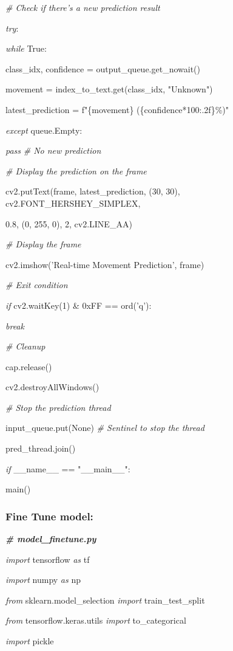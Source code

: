 \documentclass[
]{article}
\begin{document}
\emph{\# Check if there's a new prediction result}

\emph{try}:

\emph{while} True:

class\_idx, confidence = output\_queue.get\_nowait()

movement = index\_to\_text.get(class\_idx, "Unknown")

latest\_prediction = f"\{movement\} (\{confidence*100:.2f\}\%)"

\emph{except} queue.Empty:

\emph{pass} \emph{\# No new prediction}

\emph{\# Display the prediction on the frame}

cv2.putText(frame, latest\_prediction, (30, 30), cv2.FONT\_HERSHEY\_SIMPLEX,

0.8, (0, 255, 0), 2, cv2.LINE\_AA)

\emph{\# Display the frame}

cv2.imshow('Real-time Movement Prediction', frame)

\emph{\# Exit condition}

\emph{if} cv2.waitKey(1) \& 0xFF == ord('q'):

\emph{break}

\emph{\# Cleanup}

cap.release()

cv2.destroyAllWindows()

\emph{\# Stop the prediction thread}

input\_queue.put(None) \emph{\# Sentinel to stop the thread}

pred\_thread.join()

\emph{if} \_\_name\_\_ == "\_\_main\_\_":

main()

\hypertarget{fine-tune-model}{%
\subsubsection{Fine Tune model:}\label{fine-tune-model}}

\emph{\textbf{\# model\_finetune.py}}

\emph{import} tensorflow \emph{as} tf

\emph{import} numpy \emph{as} np

\emph{from} sklearn.model\_selection \emph{import} train\_test\_split

\emph{from} tensorflow.keras.utils \emph{import} to\_categorical

\emph{import} pickle
\end{document}
